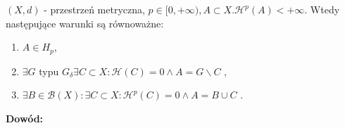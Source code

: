 \begin{tw}
	$(X,d)$ - przestrzeń metryczna, $p \in [0, +\infty), A \subset X. \mathcal{H}^p(A) < +\infty$. Wtedy następujące warunki są równoważne:
	\begin{enumerate}
		\item $A \in H_p$,
		\item $\exists G$ typu $G_{\delta} \exists C \subset X: \mathcal{H}(C)=0 \wedge A = G \backslash C$ ,
		\item $\exists B \in \mathcal{B}(X): \exists C \subset X: \mathcal{H}^p(C) = 0 \wedge A = B \cup C$ .
	\end{enumerate}

	\textbf{Dowód:} \citep[AM4, 2.52]{Tworzewski}
\end{tw}